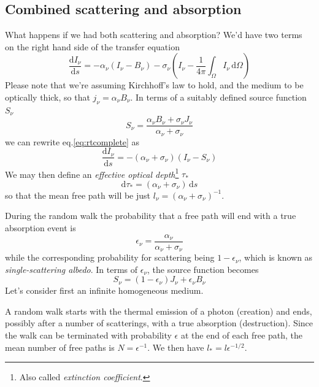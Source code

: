 \subsection{Combined scattering and absorption}
What happens if we had both scattering and absorption? We'd have two terms on the right hand side of the transfer equation 
\begin{equation}
    \frac{\text{d}I_{\nu}}{\text{d}s} = -\alpha_{\nu}(I_{\nu}-B_{\nu}) -\sigma_{\nu}\left(I_{\nu}-\frac{1}{4\pi}\int_{\Omega} I_{\nu}\,\text{d}\Omega \right)
    \label{eq:rtcomplete}
\end{equation}
Please note that we're assuming Kirchhoff's law to hold, and the medium to be optically thick, so that $j_{\nu} = \alpha_{\nu}B_{\nu}$. In terms of a suitably defined source function $S_{\nu}$
\begin{equation*}
    S_{\nu} = \frac{\alpha_{\nu}B_{\nu}+\sigma_{\nu}J_{\nu}}{\alpha_{\nu}+\sigma_{\nu}}
\end{equation*}
we can rewrite eq.\ref{eq:rtcomplete} as 
\begin{equation*}
     \frac{\text{d}I_{\nu}}{\text{d}s} = -(\alpha_{\nu}+\sigma_{\nu})(I_{\nu}-S_{\nu})
\end{equation*}
We may then define an \emph{effective optical depth}\footnote{Also called \emph{extinction coefficient}.} $\tau_{*}$ 
\begin{equation*}
    \text{d}\tau_{*} = (\alpha_{\nu}+\sigma_{\nu})\,\text{d}s
\end{equation*}
so that the mean free path will be just $l_{\nu} = (\alpha_{\nu}+\sigma_{\nu})^{-1}$.
\par During the random walk the probability that a free path will end with a true absorption event is 
\begin{equation*}
    \epsilon_{\nu} = \frac{\alpha_{\nu}}{\alpha_{\nu}+\sigma_{\nu}}
\end{equation*}
while the corresponding probability for scattering being $1-\epsilon_{\nu}$, which is known as \emph{single-scattering albedo}. In terms of $\epsilon_{\nu}$, the source function becomes 
\begin{equation*}
    S_{\nu} = (1-\epsilon_{\nu})J_{\nu}+\epsilon_{\nu}B_{\nu}
\end{equation*}
Let's consider first an infinite homogeneous medium.
\par A random walk starts with the thermal emission of a photon (creation) and ends, possibly after a number of scatterings, with a true absorption (destruction). Since the walk can be terminated with probability $\epsilon$ at the end of each free path, the mean number of free paths is $N = \epsilon^{-1}$. We then have $l_{*} = l \epsilon^{-1/2}$. 
